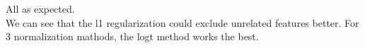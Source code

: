 \documentclass{article}
\begin{document}
\begin{tiny}
\begin{lstlisting}
\end{lstlisting}
\end{tiny}

All as expected. \\
We can see that the l1 regularization could exclude unrelated features better. For 3 normalization mathods, the logt method works the best.
\end{document}
